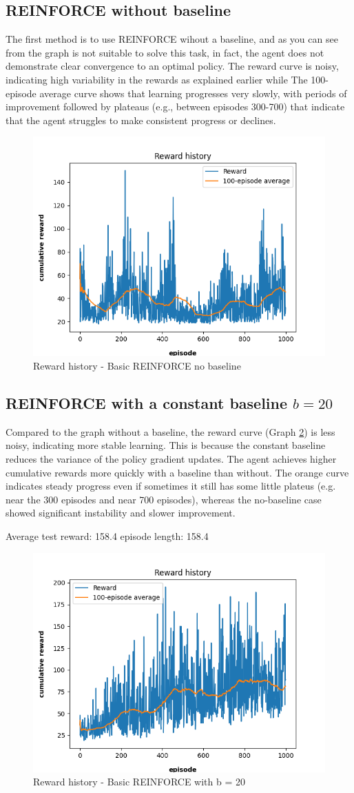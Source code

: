 \documentclass{article}
\begin{document}
\subsection{REINFORCE without baseline}
The first method is to use REINFORCE wihout a baseline, and as you can see from the graph is not suitable to solve this task, in fact, the agent does not demonstrate clear convergence to an optimal policy.
The reward curve is noisy, indicating high variability in the rewards as explained earlier while The 100-episode average curve shows that learning progresses very slowly, with periods of improvement followed by plateaus (e.g., between episodes 300-700) that indicate that the agent struggles to make consistent progress  or declines.

\begin{figure}[h]
	\centering
	\includegraphics[width=0.5\linewidth]{../data/plot/reward_history_ContinuousCartPole-v0_0_basic.png}
	\caption{Reward history - Basic REINFORCE no baseline}
	\label{fig:plot3}
\end{figure}

\subsection{REINFORCE with a constant baseline $b = 20$}
Compared to the graph without a baseline, the reward curve (Graph \ref{fig:plot4}) is less noisy, indicating more stable learning. This is because the constant baseline reduces the variance of the policy gradient updates. The agent achieves higher cumulative rewards more quickly with a baseline than without. The orange curve indicates steady progress even if sometimes it still has some little plateus (e.g. near the 300 episodes and near 700 episodes), whereas the no-baseline case showed significant instability and slower improvement.

Average test reward: 158.4 episode length: 158.4
\begin{figure}[h]
	\centering
	\includegraphics[width=0.5\linewidth]{../data/plot/reward_history_ContinuousCartPole-v0_0_constant_baseline.png}
	\caption{Reward history - Basic REINFORCE with b = 20}
	\label{fig:plot4}
\end{figure}
\end{document}
